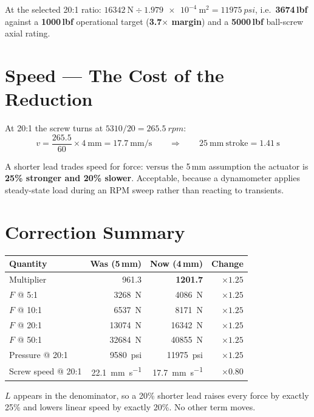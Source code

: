 \documentclass[11pt]{article}
\begin{document}
At the selected 20:1 ratio:
$\SI{16342}{\newton} \div \SI{1.979e-4}{\meter\squared} = \SI{11975}{psi}$,
i.e.\ \textbf{3674\,lbf} against a \textbf{1000\,lbf} operational target
(\textbf{3.7$\times$ margin}) and a \textbf{5000\,lbf} ball-screw axial rating.

\section*{Speed --- The Cost of the Reduction}

At 20:1 the screw turns at $5310/20 = \SI{265.5}{rpm}$:
\[
v = \frac{265.5}{60}\times\SI{4}{\milli\meter} = \SI{17.7}{\milli\meter\per\second}
\qquad\Rightarrow\qquad
\SI{25}{\milli\meter}\ \text{stroke} = \SI{1.41}{\second}
\]

A shorter lead trades speed for force: versus the 5\,mm assumption the actuator
is \textbf{25\% stronger and 20\% slower}. Acceptable, because a dynamometer
applies steady-state load during an RPM sweep rather than reacting to transients.

\section*{Correction Summary}

\begin{center}
\begin{tabular}{@{}lrrr@{}}
\toprule
\textbf{Quantity} & \textbf{Was (5\,mm)} & \textbf{Now (4\,mm)} & \textbf{Change}\\
\midrule
Multiplier         & 961.3  & \textbf{1201.7} & $\times 1.25$\\
$F$ @ 5:1          & \SI{3268}{\newton}  & \SI{4086}{\newton}  & $\times 1.25$\\
$F$ @ 10:1         & \SI{6537}{\newton}  & \SI{8171}{\newton}  & $\times 1.25$\\
$F$ @ 20:1         & \SI{13074}{\newton} & \SI{16342}{\newton} & $\times 1.25$\\
$F$ @ 50:1         & \SI{32684}{\newton} & \SI{40855}{\newton} & $\times 1.25$\\
Pressure @ 20:1    & \SI{9580}{psi}      & \SI{11975}{psi}     & $\times 1.25$\\
Screw speed @ 20:1 & \SI{22.1}{\milli\meter\per\second} & \SI{17.7}{\milli\meter\per\second} & $\times 0.80$\\
\bottomrule
\end{tabular}
\end{center}

$L$ appears in the denominator, so a 20\% shorter lead raises every force by
exactly 25\% and lowers linear speed by exactly 20\%. No other term moves.
\end{document}
